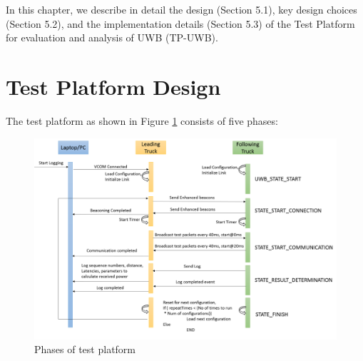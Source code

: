 In this chapter, we describe in detail the design (Section 5.1), key design choices (Section 5.2), and the implementation details (Section 5.3) of the Test Platform for evaluation and analysis of UWB (TP-UWB).

\section{Test Platform Design}
The test platform as shown in Figure \ref{fig:phasesOfTestPlatform} consists of five phases:
\begin{figure}[h!]
	\includegraphics[width=1\textwidth,keepaspectratio]{figures/PhasesofTestPlatform}
	\centering
	\caption{Phases of test platform}
	\label{fig:phasesOfTestPlatform}    
\end{figure}
